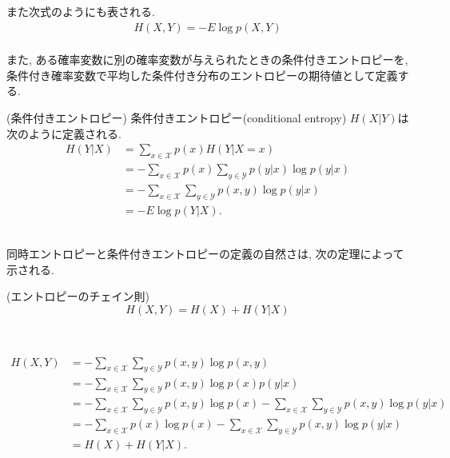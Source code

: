 \documentclass[a4j]{jsarticle}
\begin{document}
また次式のようにも表される.
\begin{align}
	H(X, Y) = - E \log p(X, Y)
\end{align}\\

また, ある確率変数に別の確率変数が与えられたときの条件付きエントロピーを, 条件付き確率変数で平均した条件付き分布のエントロピーの期待値として定義する.\\

\begin{itembox}[l]{ (条件付きエントロピー)}
	条件付きエントロピー(conditional entropy) $H(X|Y)$は次のように定義される.
	\begin{align}
		H(Y | X) & = \sum_{x \in \mathcal{X}} p(x) H(Y | X = x)                                      \\
		         & = - \sum_{x \in \mathcal{X}} p(x) \sum_{y \in \mathcal{Y}} p(y | x) \log p(y | x) \\
		         & = - \sum_{x \in \mathcal{X}} \sum_{y \in \mathcal{Y}} p(x, y) \log p(y | x)       \\
		         & = -E \log p(Y|X).
	\end{align}
\end{itembox}\\

同時エントロピーと条件付きエントロピーの定義の自然さは, 次の定理によって示される.\\

\begin{itembox}[l]{ (エントロピーのチェイン則)}
	\begin{equation}
		H(X, Y) = H(X) + H(Y | X)
	\end{equation}
\end{itembox}\\


\begin{align}
	H(X, Y) & = - \sum_{x \in \mathcal{X}} \sum_{y \in \mathcal{Y}} p(x, y) \log p(x, y)                                                                        \\
	        & = - \sum_{x \in \mathcal{X}} \sum_{y \in \mathcal{Y}} p(x, y) \log p(x) p(y | x)                                                                  \\
	        & = - \sum_{x \in \mathcal{X}} \sum_{y \in \mathcal{Y}} p(x, y) \log p(x) - \sum_{x \in \mathcal{X}} \sum_{y \in \mathcal{Y}} p(x, y) \log p(y | x) \\
	        & = - \sum_{x \in \mathcal{X}} p(x) \log p(x)- \sum_{x \in \mathcal{X}} \sum_{y \in \mathcal{Y}} p(x, y) \log p(y | x)                              \\
	        & = H(X) + H(Y|X).
\end{align}\\
\end{document}
